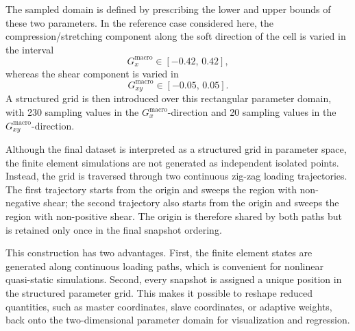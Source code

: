 \documentclass[11pt,a4paper]{article}
\begin{document}
The sampled domain is defined by prescribing the lower and upper bounds of these
two parameters. In the reference case considered here, the compression/stretching
component along the soft direction of the cell is varied in the interval
\[
G^{\mathrm{macro}}_x \in [-0.42,\,0.42],
\]
whereas the shear component is varied in
\[
G^{\mathrm{macro}}_{xy} \in [-0.05,\,0.05].
\]
A structured grid is then introduced over this rectangular parameter domain, with
230 sampling values in the \(G^{\mathrm{macro}}_x\)-direction and 20 sampling
values in the \(G^{\mathrm{macro}}_{xy}\)-direction.

Although the final dataset is interpreted as a structured grid in parameter
space, the finite element simulations are not generated as independent isolated
points. Instead, the grid is traversed through two continuous zig-zag loading
trajectories. The first trajectory starts from the origin and sweeps the region
with non-negative shear; the second trajectory also starts from the origin and
sweeps the region with non-positive shear. The origin is therefore shared by
both paths but is retained only once in the final snapshot ordering.

This construction has two advantages. First, the finite element states are
generated along continuous loading paths, which is convenient for nonlinear
quasi-static simulations. Second, every snapshot is assigned a unique position in
the structured parameter grid. This makes it possible to reshape reduced
quantities, such as master coordinates, slave coordinates, or adaptive weights,
back onto the two-dimensional parameter domain for visualization and regression.

\end{document}
